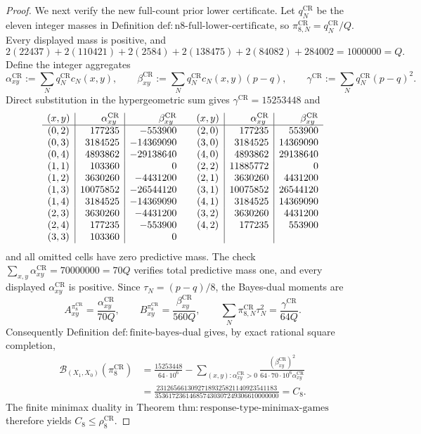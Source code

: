 \documentclass{article}
\begin{document}
\begin{proof}
We next verify the new full-count prior lower certificate.  Let \(q_N^{\mathrm{CR}}\) be the eleven integer masses in Definition \(\mathrm{def{:}n8\mbox{-}full\mbox{-}lower\mbox{-}certificate}\), so \(\pi_{8,N}^{\mathrm{CR}}=q_N^{\mathrm{CR}}/Q\).  Every displayed mass is positive, and
\[
 2(22437)+2(110421)+2(2584)+2(138475)+2(84082)+284002
 =1000000=Q.
\]
Define the integer aggregates
\[
 \alpha_{xy}^{\mathrm{CR}}:=\sum_Nq_N^{\mathrm{CR}}c_N(x,y),\qquad
 \beta_{xy}^{\mathrm{CR}}:=\sum_Nq_N^{\mathrm{CR}}c_N(x,y)(p-q),\qquad
 \gamma^{\mathrm{CR}}:=\sum_Nq_N^{\mathrm{CR}}(p-q)^2.
\]
Direct substitution in the hypergeometric sum gives \(\gamma^{\mathrm{CR}}=15253448\) and
\[
\begin{array}{c|r|r@{\qquad}c|r|r}
(x,y)&\alpha_{xy}^{\mathrm{CR}}&\beta_{xy}^{\mathrm{CR}}&(x,y)&\alpha_{xy}^{\mathrm{CR}}&\beta_{xy}^{\mathrm{CR}}\\ \hline
(0,2)&177235&-553900&(2,0)&177235&553900\\
(0,3)&3184525&-14369090&(3,0)&3184525&14369090\\
(0,4)&4893862&-29138640&(4,0)&4893862&29138640\\
(1,1)&103360&0&(2,2)&11885772&0\\
(1,2)&3630260&-4431200&(2,1)&3630260&4431200\\
(1,3)&10075852&-26544120&(3,1)&10075852&26544120\\
(1,4)&3184525&-14369090&(4,1)&3184525&14369090\\
(2,3)&3630260&-4431200&(3,2)&3630260&4431200\\
(2,4)&177235&-553900&(4,2)&177235&553900\\
(3,3)&103360&0&&&
\end{array}
\]
and all omitted cells have zero predictive mass.  The check
\(
 \sum_{x,y}\alpha_{xy}^{\mathrm{CR}}=70000000=70Q
\)
verifies total predictive mass one, and every displayed \(\alpha_{xy}^{\mathrm{CR}}\) is positive.  Since \(\tau_N=(p-q)/8\), the Bayes-dual moments are
\[
 A_{xy}^{\pi_8^{\mathrm{CR}}}=\frac{\alpha_{xy}^{\mathrm{CR}}}{70Q},\qquad
 B_{xy}^{\pi_8^{\mathrm{CR}}}=\frac{\beta_{xy}^{\mathrm{CR}}}{560Q},\qquad
 \sum_N\pi_{8,N}^{\mathrm{CR}}\tau_N^2=\frac{\gamma^{\mathrm{CR}}}{64Q}.
\]
Consequently Definition \(\mathrm{def{:}finite\mbox{-}bayes\mbox{-}dual}\) gives, by exact rational square completion,
\[
\begin{aligned}
 \mathcal B_{(X_1,X_0)}(\pi_8^{\mathrm{CR}})
 &=\frac{15253448}{64\cdot10^6}
 -\sum_{(x,y):\alpha_{xy}^{\mathrm{CR}}>0}
 \frac{(\beta_{xy}^{\mathrm{CR}})^2}
 {64\cdot70\cdot10^6\alpha_{xy}^{\mathrm{CR}}}\\
 &=\frac{23126566130927189325821140923541183}
 {353617236146857430307249306610000000}=C_8.
\end{aligned}
\]
The finite minimax duality in Theorem \(\mathrm{thm{:}response\mbox{-}type\mbox{-}minimax\mbox{-}games}\) therefore yields \(C_8\leq\rho_8^{\mathrm{CR}}\).


\end{proof}
\end{document}
